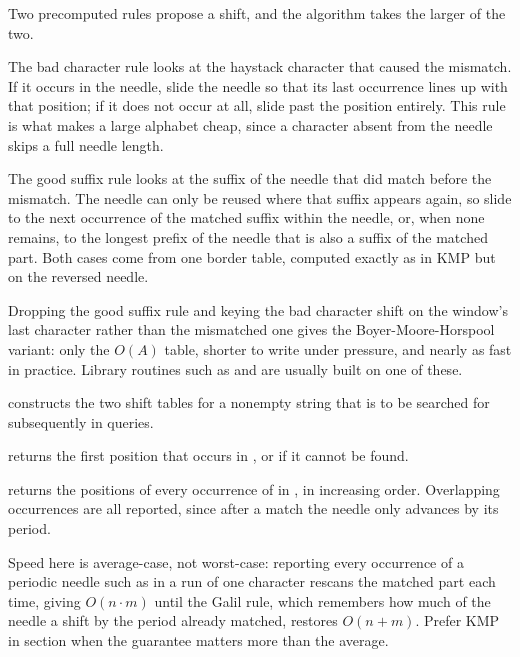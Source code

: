 Two precomputed rules propose a shift, and the algorithm takes the larger of the two.

The bad character rule looks at the haystack character that caused the mismatch. If it occurs in the needle, slide the needle so that its last occurrence lines up with that position; if it does not occur at all, slide past the position entirely. This rule is what makes a large alphabet cheap, since a character absent from the needle skips a full needle length.

The good suffix rule looks at the suffix of the needle that did match before the mismatch. The needle can only be reused where that suffix appears again, so slide to the next occurrence of the matched suffix within the needle, or, when none remains, to the longest prefix of the needle that is also a suffix of the matched part. Both cases come from one border table, computed exactly as in KMP but on the reversed needle.

Dropping the good suffix rule and keying the bad character shift on the window's last character rather than the mismatched one gives the Boyer-Moore-Horspool variant: only the $O(A)$ table, shorter to write under pressure, and nearly as fast in practice. Library routines such as  and  are usually built on one of these.

\begin{compactitem}
  \item {} constructs the two shift tables for a nonempty string  that is to be searched for subsequently in  queries.
  \item {} returns the first position that  occurs in , or  if it cannot be found.
  \item {} returns the positions of every occurrence of  in , in increasing order. Overlapping occurrences are all reported, since after a match the needle only advances by its period.
\end{compactitem}

Speed here is average-case, not worst-case: reporting every occurrence of a periodic needle such as  in a run of one character rescans the matched part each time, giving $O(n \cdot m)$ until the Galil rule, which remembers how much of the needle a shift by the period already matched, restores $O(n + m)$. Prefer KMP in section  when the guarantee matters more than the average.

